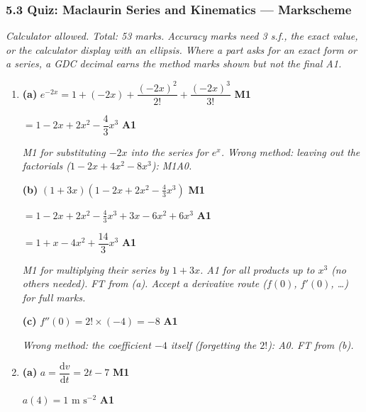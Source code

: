 \documentclass[12pt, twoside]{article}
\begin{document}
\subsubsection*{5.3 Quiz: Maclaurin Series and Kinematics --- Markscheme}

\emph{Calculator allowed. Total: 53 marks. Accuracy marks need 3 s.f., the
exact value, or the calculator display with an ellipsis. Where a part asks
for an exact form or a series, a GDC decimal earns the method marks shown
but not the final A1.}

\begin{enumerate}[itemsep=0.3cm]

\item[1.] [Maximum mark: 6]

\textbf{(a)} $e^{-2x} = 1 + (-2x) + \dfrac{(-2x)^{2}}{2!} + \dfrac{(-2x)^{3}}{3!}$ \hfill \textbf{M1}

$= 1 - 2x + 2x^{2} - \dfrac{4}{3}x^{3}$ \hfill \textbf{A1}

\emph{M1 for substituting $-2x$ into the series for $e^{x}$. Wrong method:
leaving out the factorials ($1 - 2x + 4x^{2} - 8x^{3}$): M1A0.}

\textbf{(b)} $(1 + 3x)\left(1 - 2x + 2x^{2} - \frac{4}{3}x^{3}\right)$ \hfill \textbf{M1}

$= 1 - 2x + 2x^{2} - \frac{4}{3}x^{3} + 3x - 6x^{2} + 6x^{3}$ \hfill \textbf{A1}

$= 1 + x - 4x^{2} + \dfrac{14}{3}x^{3}$ \hfill \textbf{A1}

\emph{M1 for multiplying their series by $1 + 3x$. A1 for all products up to
$x^{3}$ (no others needed). FT from (a). Accept a derivative route
($f(0)$, $f'(0)$, \ldots) for full marks.}

\textbf{(c)} $f''(0) = 2! \times (-4) = -8$ \hfill \textbf{A1}

\emph{Wrong method: the coefficient $-4$ itself (forgetting the $2!$): A0.
FT from (b).}

\newpage

\item[2.] [Maximum mark: 7]

\textbf{(a)} $a = \dfrac{\mathrm{d}v}{\mathrm{d}t} = 2t - 7$ \hfill \textbf{M1}

$a(4) = 1 \text{ m s}^{-2}$ \hfill \textbf{A1}


\end{enumerate}
\end{document}

